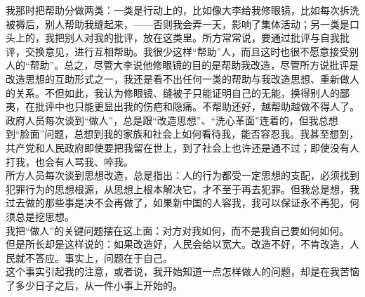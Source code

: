 我那时把帮助分做两类：一类是行动上的，比如像大李给我修眼镜，比如每次拆洗被褥后，别人帮助我缝起来，——否则我会弄一天，影响了集体活动；另一类是口头上的，我把别人对我的批评，放在这类里。所方常常说，要通过批评与自我批评，交换意见，进行互相帮助。我很少这样“帮助”人，而且这时也很不愿意接受别人的“帮助”。总之，尽管大李说他修眼镜的目的是帮助我改造，尽管所方说批评是改造思想的互助形式之一，我还是看不出任何一类的帮助与我改造思想、重新做人的关系。不但如此，我认为修眼镜、缝被子只能证明自己的无能，换得别人的鄙夷，在批评中也只能更显出我的伤疤和隐痛。不帮助还好，越帮助越做不得人了。\\

政府人员每次谈到“做人”，总是跟“改造思想”、“洗心革面”连着的，但我总想到“脸面”问题，总想到我的家族和社会上如何看待我，能否容忍我。我甚至想到，共产党和人民政府即使要把我留在世上，到了社会上也许还是通不过；即使没有人打我，也会有人骂我、啐我。\\

所方人员每次谈到思想改造，总是指出：人的行为都受一定思想的支配，必须找到犯罪行为的思想根源，从思想上根本解决它，才不至于再去犯罪。但我总是想，我过去做的那些事是决不会再做了，如果新中国的人容我，我可以保证永不再犯，何须总是挖思想。\\

我把“做人”的关键问题摆在这上面：对方对我如何，而不是我自己要如何如何。\\

但是所长却是这样说的：如果改造好，人民会给以宽大。改造不好，不肯改造，人民就不答应。事实上，问题在于自己。\\

这个事实引起我的注意，或者说，我开始知道一点怎样做人的问题，却是在我苦恼了多少日子之后，从一件小事上开始的。